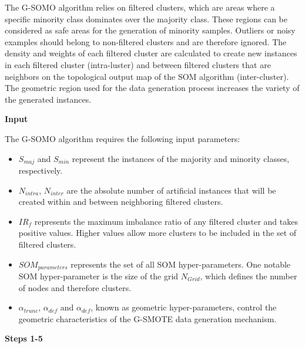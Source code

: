 \documentclass[parskip=full]{scrartcl}
\begin{document}
The G-SOMO algorithm relies on filtered clusters, which are areas where a
specific minority class dominates over the majority class. These regions can be
considered as safe areas for the generation of minority samples. Outliers or
noisy examples should belong to non-filtered clusters and are therefore ignored.
The density and weights of each filtered cluster are calculated to create new
instances in each filtered cluster (intra-luster) and between filtered clusters
that are neighbors on the topological output map of the SOM algorithm
(inter-cluster). The geometric region used for the data generation process
increases the variety of the generated instances.

\textbf{Input} 

The G-SOMO algorithm requires the following input parameters: 

\begin{itemize}

	\renewcommand\labelitemi{--}

	\item $S_{maj}$ and $S_{min}$ represent the instances of the majority and
	minority classes, respectively. 

	\item $N_{intra}$, $N_{inter}$ are the absolute number of artificial
	instances that will be created within and between neighboring filtered
	clusters.

	\item $IR_{f}$ represents the maximum imbalance ratio of any filtered
	cluster and takes positive values. Higher values allow more clusters to be
	included in the set of filtered clusters.
	
	\item $SOM_{parameters}$ represents the set of all SOM hyper-parameters. One
	notable SOM hyper-parameter is the size of the grid $N_{Grid}$, which defines the
	number of nodes and therefore clusters. 

	\item $\alpha_{trunc}$, $\alpha_{def}$ and $\alpha_{def}$, known as
	geometric hyper-parameters, control the geometric characteristics of the 
	G-SMOTE data generation mechanism.

\end{itemize}

\textbf{Steps 1-5} 
\end{document}
